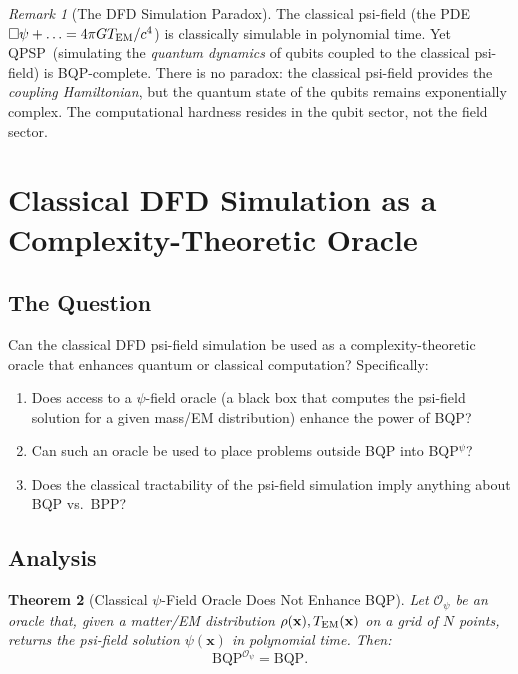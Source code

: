 \documentclass[11pt]{article}
\newtheorem{theorem}{Theorem}[section]
\theoremstyle{definition}
\theoremstyle{remark}
\newtheorem{remark}[theorem]{Remark}
\newcommand{\QPSP}{\textsc{QPSP}}
\begin{document}
\begin{remark}[The DFD Simulation Paradox]
\label{rem:paradox}
The classical psi-field (the PDE $\Box\psi + \ldots = 4\pi GT_{\rm EM}/c^4$)
is classically simulable in polynomial time.  Yet \QPSP\ (simulating
the \emph{quantum dynamics} of qubits coupled to the classical
psi-field) is BQP-complete.  There is no paradox: the classical
psi-field provides the \emph{coupling Hamiltonian}, but the quantum
state of the qubits remains exponentially complex.  The computational
hardness resides in the qubit sector, not the field sector.
\end{remark}

\section{Classical DFD Simulation as a Complexity-Theoretic Oracle}
\label{sec:classical-oracle}

\subsection{The Question}
\label{sec:oracle-question}

Can the classical DFD psi-field simulation be used as a
complexity-theoretic oracle that enhances quantum or classical
computation?  Specifically:
\begin{enumerate}[label=(\alph*)]
  \item Does access to a $\psi$-field oracle (a black box that computes
    the psi-field solution for a given mass/EM distribution) enhance the
    power of BQP?
  \item Can such an oracle be used to place problems outside BQP into
    BQP$^{\psi}$?
  \item Does the classical tractability of the psi-field simulation imply
    anything about BQP vs.\ BPP?
\end{enumerate}

\subsection{Analysis}
\label{sec:oracle-analysis}

\begin{theorem}[Classical $\psi$-Field Oracle Does Not Enhance BQP]
\label{thm:oracle-no-enhancement}
Let $\mathcal{O}_\psi$ be an oracle that, given a matter/EM distribution
$\rho(\mathbf{x}), T_{\rm EM}(\mathbf{x})$ on a grid of $N$ points,
returns the psi-field solution $\psi(\mathbf{x})$ in polynomial time.
Then:
\begin{equation}
  \mathrm{BQP}^{\mathcal{O}_\psi} = \mathrm{BQP}.
  \label{eq:bqp-oracle}
\end{equation}
\end{theorem}
\end{document}
